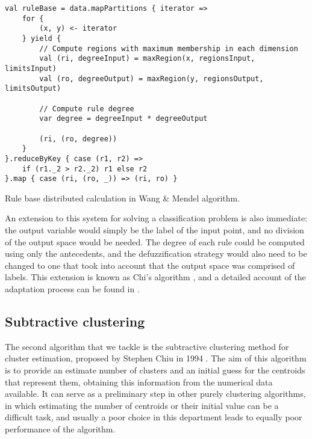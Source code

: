 \begin{Listing}[h!]
\begin{lstlisting}[basicstyle=\normalsize\ttfamily, xleftmargin=.5cm, aboveskip=0em, belowskip=0em]
val ruleBase = data.mapPartitions { iterator =>
    for {
        (x, y) <- iterator
    } yield {
        // Compute regions with maximum membership in each dimension
        val (ri, degreeInput) = maxRegion(x, regionsInput, limitsInput)
        val (ro, degreeOutput) = maxRegion(y, regionsOutput, limitsOutput)

        // Compute rule degree
        var degree = degreeInput * degreeOutput

        (ri, (ro, degree))
    }
}.reduceByKey { case (r1, r2) =>
    if (r1._2 > r2._2) r1 else r2
}.map { case (ri, (ro, _)) => (ri, ro) }
\end{lstlisting}
\caption{Rule base distributed calculation in Wang \& Mendel algorithm.}
  \label{lst:wm}
\end{Listing}

An extension to this system for solving a classification problem is also immediate: the output variable would simply be the label of the input point, and no division of the output space would be needed. The degree of each rule could be computed using only the antecedents, and the defuzzification strategy would also need to be changed to one that took into account that the output space was comprised of labels. This extension is known as Chi's algorithm \cite[141]{chi1996fuzzy}, and a detailed account of the adaptation process can be found in \cite{estevez2018revisiting}.

\subsection{Subtractive clustering}

The second algorithm that we tackle is the subtractive clustering method for cluster estimation, proposed by Stephen Chiu in 1994 \cite{chiu1994identification}. The aim of this algorithm is to provide an estimate number of clusters and an initial guess for the centroids that represent them, obtaining this information from the numerical data available. It can serve as a preliminary step in other purely clustering algorithms, in which estimating the number of centroids or their initial value can be a difficult task, and usually a poor choice in this department leads to equally poor performance of the algorithm.

